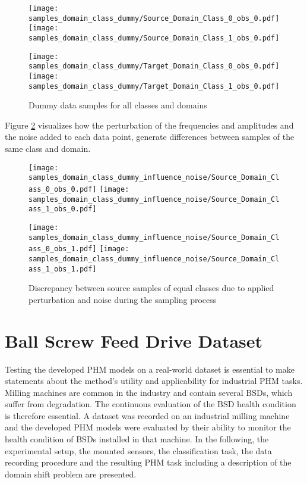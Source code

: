\begin{figure}[H]
  \centering
  \texttt{[image: samples\_domain\_class\_dummy/Source\_Domain\_Class\_0\_obs\_0.pdf]}
  \hspace{.3cm}
  \texttt{[image: samples\_domain\_class\_dummy/Source\_Domain\_Class\_1\_obs\_0.pdf]}

  \vspace{.3cm}

  \texttt{[image: samples\_domain\_class\_dummy/Target\_Domain\_Class\_0\_obs\_0.pdf]}
  \hspace{.3cm}
  \texttt{[image: samples\_domain\_class\_dummy/Target\_Domain\_Class\_1\_obs\_0.pdf]}

  \caption{Dummy data samples for all classes and domains}
  \label{fig:samples_domain_class_dummy}
\end{figure}

Figure \ref{fig:samples_domain_class_dummy_influence_noise} visualizes how the perturbation of the frequencies and amplitudes and the noise added to each data point, generate differences between samples of the same class and domain.

\begin{figure}[H]
  \centering
  \texttt{[image: samples\_domain\_class\_dummy\_influence\_noise/Source\_Domain\_Class\_0\_obs\_0.pdf]}
  \hspace{.3cm}
  \texttt{[image: samples\_domain\_class\_dummy\_influence\_noise/Source\_Domain\_Class\_1\_obs\_0.pdf]}

  \vspace{.3cm}

  \texttt{[image: samples\_domain\_class\_dummy\_influence\_noise/Source\_Domain\_Class\_0\_obs\_1.pdf]}
  \hspace{.3cm}
  \texttt{[image: samples\_domain\_class\_dummy\_influence\_noise/Source\_Domain\_Class\_1\_obs\_1.pdf]}

  \caption{Discrepancy between source samples of equal classes due to applied perturbation and noise during the sampling process}
  \label{fig:samples_domain_class_dummy_influence_noise}
\end{figure}

\section{Ball Screw Feed Drive Dataset} \label{sec:real_world_dataset}
Testing the developed PHM models on a real-world dataset is essential to make statements about the method's utility and applicability for industrial PHM tasks. Milling machines are common in the industry and contain several BSDs, which suffer from degradation. The continuous evaluation of the BSD health condition is therefore essential. A dataset was recorded on an industrial milling machine and the developed PHM models were evaluated by their ability to monitor the health condition of BSDs installed in that machine. In the following, the experimental setup, the mounted sensors, the classification task, the data recording procedure and the resulting PHM task including a description of the domain shift problem are presented. 

